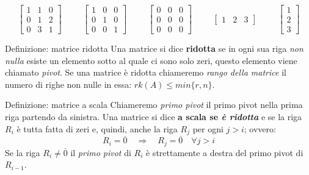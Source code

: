 \documentclass[x11names]{article}
\begin{document}
$$
\begin{bmatrix}1 & 1 & 0 \\ 0 & 1 & 2 \\ 0 & 3 & 1\end{bmatrix}
\hspace{1cm}
\begin{bmatrix}1 & 0 & 0\\0 & 1 & 0\\ 0 & 0 & 1\end{bmatrix}
\hspace{1cm}
\begin{bmatrix}0 & 0 & 0\\0 & 0 & 0\\ 0 & 0 & 0\end{bmatrix}
\hspace{1cm}
\begin{bmatrix}1 & 2 & 3\end{bmatrix}
\hspace{1cm}
\begin{bmatrix}1\\ 2 \\ 3 \end{bmatrix}
$$

\begin{center}
\colorbox{Azure2}{\begin{minipage}{5.75in}
\begin{blues}{Definizione: matrice ridotta}
    Una matrice si dice \textbf{ridotta} se in ogni sua riga \textit{non nulla} esiste un elemento sotto al quale ci sono solo zeri, questo elemento viene chiamato \textit{pivot}. Se una matrice è ridotta chiameremo \textit{rango della matrice} il numero di righe non nulle in essa: $rk(A) \leq min\{r,n\}$.
\end{blues}


\begin{blues}{Definizione: matrice a scala}
    Chiameremo \textit{primo pivot} il primo pivot nella prima riga partendo da sinistra. Una matrice si dice \textbf{a scala se \textit{è ridotta}} e se la riga $R_i$ è tutta fatta di zeri e, quindi, anche la riga $R_j$ per ogni $j>i$; ovvero: 
    $$
    R_i = \overline{0}\quad \Rightarrow \quad R_j = \overline{0} \quad \forall j>i
    $$
    Se la riga $R_i \neq \overline{0}$ il \textit{primo pivot} di $R_i$ è strettamente a destra del primo pivot di $R_{i-1}$.
\end{blues}
\end{minipage}}        
\end{center}
\end{document}
